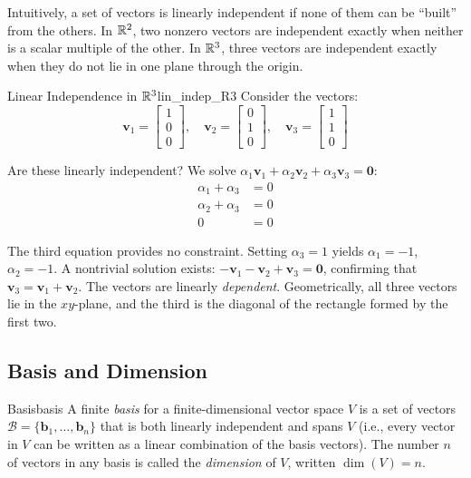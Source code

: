 Intuitively, a set of vectors is linearly independent if none of them can be ``built'' from the others. In $\mathbb{R}^2$, two nonzero vectors are independent exactly when neither is a scalar multiple of the other. In $\mathbb{R}^3$, three vectors are independent exactly when they do not lie in one plane through the origin.

\begin{example}{Linear Independence in \texorpdfstring{$\mathbb{R}^3$}{R3}}{lin_indep_R3}
Consider the vectors:
\begin{equation}
    \mathbf{v}_1 = \begin{bmatrix} 1 \\ 0 \\ 0 \end{bmatrix}, \quad
    \mathbf{v}_2 = \begin{bmatrix} 0 \\ 1 \\ 0 \end{bmatrix}, \quad
    \mathbf{v}_3 = \begin{bmatrix} 1 \\ 1 \\ 0 \end{bmatrix}
\end{equation}

Are these linearly independent? We solve $\alpha_1 \mathbf{v}_1 + \alpha_2 \mathbf{v}_2 + \alpha_3 \mathbf{v}_3 = \mathbf{0}$:
\begin{align}
    \alpha_1 + \alpha_3 &= 0 \\
    \alpha_2 + \alpha_3 &= 0 \\
    0 &= 0
\end{align}

The third equation provides no constraint. Setting $\alpha_3 = 1$ yields $\alpha_1 = -1$, $\alpha_2 = -1$. A nontrivial solution exists: $-\mathbf{v}_1 - \mathbf{v}_2 + \mathbf{v}_3 = \mathbf{0}$, confirming that $\mathbf{v}_3 = \mathbf{v}_1 + \mathbf{v}_2$. The vectors are linearly \emph{dependent}. Geometrically, all three vectors lie in the $xy$-plane, and the third is the diagonal of the rectangle formed by the first two.
\end{example}

\subsection{Basis and Dimension}
\label{subsec:basis_dimension}

\begin{definition}{Basis}{basis}
A finite \emph{basis} for a finite-dimensional vector space $V$ is a set of vectors $\mathcal{B} = \{\mathbf{b}_1, \ldots, \mathbf{b}_n\}$ that is both linearly independent and spans $V$ (i.e., every vector in $V$ can be written as a linear combination of the basis vectors). The number $n$ of vectors in any basis is called the \emph{dimension} of $V$, written $\dim(V) = n$.
\end{definition}

